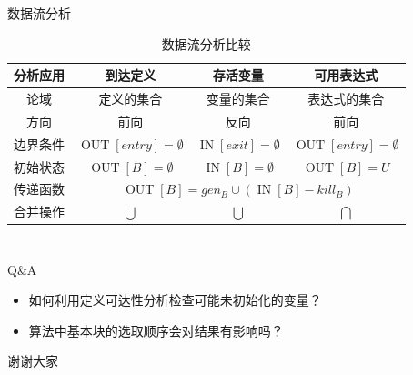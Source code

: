\documentclass{beamer}
\newcommand{\IN}{\operatorname{IN}}
\newcommand{\OUT}{\operatorname{OUT}}
\begin{document}
\begin{frame}{数据流分析}
    \begin{table}[htb]
        \centering
        \caption{数据流分析比较}
        \begin{tabular}{cccc}
            \toprule
            分析应用 & 到达定义 & 存活变量 & 可用表达式\\
            \midrule
            论域 & 定义的集合 & 变量的集合 & 表达式的集合\\
            方向 & 前向 & 反向 & 前向 \\
            边界条件 & $\OUT[entry]=\emptyset$ & $\IN[exit]=\emptyset$ & $\OUT[entry]=\emptyset$ \\
            初始状态 & $\OUT[B]=\emptyset$ & $\IN[B]=\emptyset$ & $\OUT[B]=U$ \\
            传递函数 & \multicolumn{3}{c}{$\OUT[B]=gen_B\cup(\IN[B]-kill_B)$} \\
            合并操作 & $\bigcup$ & $\bigcup$ & $\bigcap$ \\
            \bottomrule
        \end{tabular}
    \end{table}
\end{frame}

\appendix
\section{\appendixname}

\begin{frame}{Q\&A}
    \begin{itemize}
        \item 如何利用定义可达性分析检查可能未初始化的变量？
        \item 算法中基本块的选取顺序会对结果有影响吗？
    \end{itemize}
\end{frame}

\begin{frame}
    \Huge\center 谢谢大家
\end{frame}
    
\end{document}
